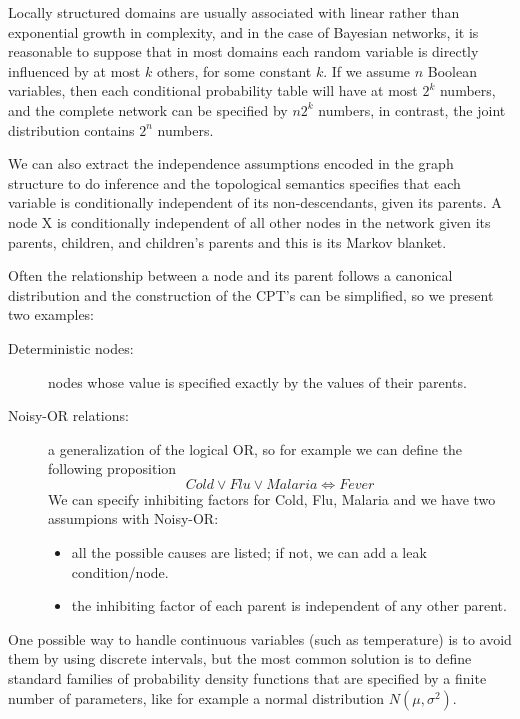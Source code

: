 Locally structured domains are usually associated with linear rather than exponential
growth in complexity, and in the case of Bayesian networks, it is reasonable 
to suppose that in most domains each random variable is directly influenced by 
at most $k$ others, for some constant $k$.\newline
If we assume $n$ Boolean variables, then each conditional probability table will have at
most $2^k$ numbers, and the complete network can be specified by $n2^k$ numbers, in
contrast, the joint distribution contains $2^n$ numbers.

We can also extract the independence assumptions encoded in the graph structure 
to do inference and the topological semantics specifies that each variable
is conditionally independent of its non-descendants, given its parents.\newline
A node X is conditionally independent of all other nodes in the network given its parents,
children, and children’s parents and this is its Markov blanket.

Often the relationship between a node and its parent follows a canonical
distribution and the construction of the CPT’s can be simplified, so we present
two examples:
\begin{description}
   \item [Deterministic nodes: ] nodes whose value is specified exactly by the 
	   values of their parents.
   \item [Noisy-OR relations: ] a generalization of the logical OR, so for example we can 
	   define the following proposition
	   	\[ Cold \lor Flu \lor Malaria \iff Fever \]
		We can specify inhibiting factors for Cold, Flu, Malaria and we have two
		assumpions with Noisy-OR:
		\begin{itemize}
			\item all the possible causes are listed; if not, we can add a 
			      leak condition/node.
			\item the inhibiting factor of each parent is independent of any
			      other parent.
		\end{itemize}
\end{description}
One possible way to handle continuous variables (such as temperature) is to avoid
them by using discrete intervals, but the most common solution is to define standard
families of probability density functions that are specified 
by a finite number of parameters, like for example a normal distribution $N(\mu, \sigma^2)$.

